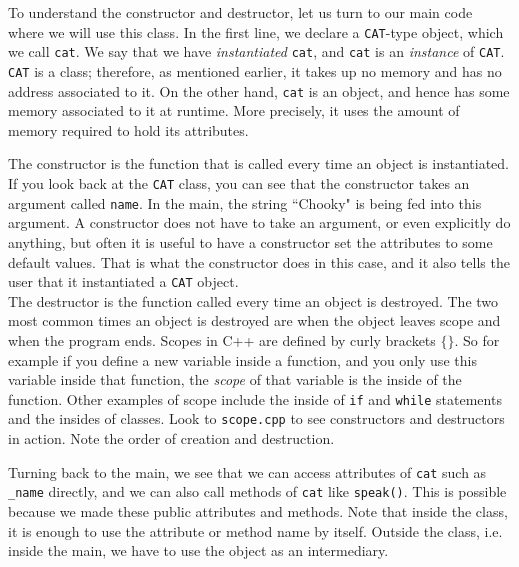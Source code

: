 

To understand the constructor and destructor, let us turn to our main
code where we will use this class. In the first line, we declare a
\texttt{CAT}-type object, which we call \texttt{cat}. We say that we have
{\it instantiated} \texttt{cat}, and \texttt{cat} is an {\it instance}
of \texttt{CAT}. \texttt{CAT} is a class; therefore, as mentioned
earlier, it takes up no memory and has no address associated to it.
On the other hand, \texttt{cat} is an object, and hence has some
memory associated to it at runtime. More precisely, it uses the
amount of memory required to hold its attributes.

The constructor is the function that is called every time an object is
instantiated. If you look back at the \texttt{CAT} class, you can see that
the constructor takes an argument called \texttt{name}. In the main,
the string ``Chooky" is being fed into this argument. A constructor does
not have to take an argument, or even explicitly do anything, but often
it is useful to have a constructor set the attributes to some default values.
That is what the constructor does in this case, and it also tells the
user that it instantiated a \texttt{CAT} object.\\



The destructor is the function called every time an object is destroyed.
The two most common times an object is destroyed are when the object
leaves scope and when the program ends. Scopes in C++ are defined by
curly brackets $\{\}$. So for example if you define a new variable
inside a function, and you only use this variable inside that function,
the {\it scope} of that variable is the inside of the function. 
Other examples of scope include
the inside of \texttt{if} and \texttt{while} statements and the
insides of classes. Look to \texttt{scope.cpp} to see constructors and
destructors in action. Note the order of creation and destruction.

Turning back to the main, we see that we can access attributes of
\texttt{cat} such as \texttt{\_name} directly, and we can also call
methods of \texttt{cat} like \texttt{speak()}. This is possible because
we made these public attributes and methods. Note that inside the class,
it is enough to use the attribute or method name by itself. Outside the
class, i.e. inside the main, we have to use the object as an 
intermediary.


